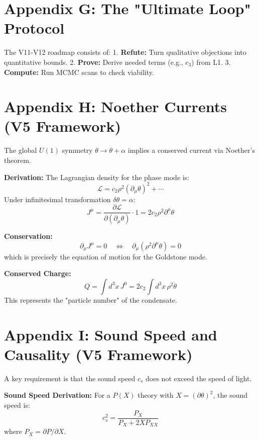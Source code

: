 \documentclass[a4paper,12pt]{article}
\begin{document}
\section{Appendix G: The "Ultimate Loop" Protocol}
The V11-V12 roadmap consists of:
1. \textbf{Refute:} Turn qualitative objections into quantitative bounds.
2. \textbf{Prove:} Derive needed terms (e.g., $c_3$) from L1.
3. \textbf{Compute:} Run MCMC scans to check viability.

\section{Appendix H: Noether Currents (V5 Framework)}
The global $U(1)$ symmetry $\theta \to \theta + \alpha$ implies a conserved current via Noether's theorem.

\textbf{Derivation:}
The Lagrangian density for the phase mode is:
\begin{equation}
    \mathcal{L} = c_2 \rho^2 (\partial_\mu \theta)^2 + \cdots
\end{equation}
Under infinitesimal transformation $\delta\theta = \alpha$:
\begin{equation}
    J^\mu = \frac{\partial \mathcal{L}}{\partial(\partial_\mu \theta)} \cdot 1 = 2c_2 \rho^2 \partial^\mu \theta
\end{equation}

\textbf{Conservation:}
\begin{equation}
    \partial_\mu J^\mu = 0 \quad \Leftrightarrow \quad \partial_\mu(\rho^2 \partial^\mu \theta) = 0
\end{equation}
which is precisely the equation of motion for the Goldstone mode.

\textbf{Conserved Charge:}
\begin{equation}
    Q = \int d^3x \, J^0 = 2c_2 \int d^3x \, \rho^2 \dot{\theta}
\end{equation}
This represents the "particle number" of the condensate.

\section{Appendix I: Sound Speed and Causality (V5 Framework)}
A key requirement is that the sound speed $c_s$ does not exceed the speed of light.

\textbf{Sound Speed Derivation:}
For a $P(X)$ theory with $X = (\partial\theta)^2$, the sound speed is:
\begin{equation}
    c_s^2 = \frac{P_X}{P_X + 2X P_{XX}}
\end{equation}
where $P_X = \partial P / \partial X$.
\end{document}
